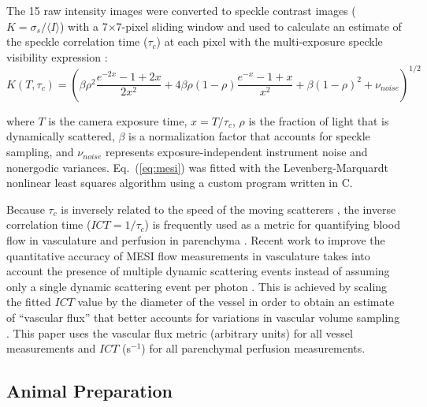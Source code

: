 \documentclass[12pt]{spieman}
\begin{document}
\begin{spacing}{2}
The 15 raw intensity images were converted to speckle contrast images ($K = \sigma_{s} / {\langle{I}\rangle}$) with a 7$\times$7-pixel sliding window and used to calculate an estimate of the speckle correlation time ($\tau_c$) at each pixel with the multi-exposure speckle visibility expression \cite{Parthasarathy:2008el}:
%
\begin{equation}
    \label{eq:mesi}
    K(T,\tau_c) =
        \left(
        \beta\rho^2\frac{e^{-2x} - 1 + 2x}{2x^2} +
        4\beta\rho(1 - \rho)\frac{e^{-x} - 1 + x}{x^2} +
        \beta(1 - \rho)^2 +
        \nu_{noise}
        \right)^{1/2}
\end{equation}

\noindent where $T$ is the camera exposure time, $x = T/\tau_c$, $\rho$ is the fraction of light that is dynamically scattered, $\beta$ is a normalization factor that accounts for speckle sampling, and $\nu_{noise}$ represents exposure-independent instrument noise and nonergodic variances. Eq.~(\ref{eq:mesi}) was fitted with the Levenberg-Marquardt nonlinear least squares algorithm \cite{Lourakis:2005} using a custom program written in C.

Because $\tau_c$ is inversely related to the speed of the moving scatterers \cite{Bonner:1981hg,Briers:1996kfa}, the inverse correlation time ($ICT = 1/\tau_c$) is frequently used as a metric for quantifying blood flow in vasculature and perfusion in parenchyma \cite{Ayata:2004ba,Strong:2005kj,Sullender:2018ff}. Recent work to improve the quantitative accuracy of MESI flow measurements in vasculature takes into account the presence of multiple dynamic scattering events instead of assuming only a single dynamic scattering event per photon \cite{Kazmi:2015du}. This is achieved by scaling the fitted $ICT$ value by the diameter of the vessel in order to obtain an estimate of ``vascular flux'' that better accounts for variations in vascular volume sampling \cite{Kazmi:2015du,Richards:2017df}. This paper uses the vascular flux metric (arbitrary units) for all vessel measurements and $ICT$ (s$^{-1}$) for all parenchymal perfusion measurements.



\subsection{Animal Preparation}


\end{spacing}
\end{document}
